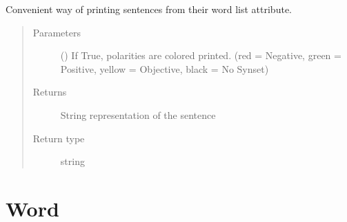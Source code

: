 \documentclass[letterpaper,10pt,english]{sphinxmanual}
\begin{document}
\begin{fulllineitems}
\begin{fulllineitems}
\begin{quote}
\begin{quote}
\begin{description}
\end{description}\end{quote}
\end{quote}

\end{fulllineitems}


\begin{fulllineitems}
\label{\detokenize{classes:loacore.classes.classes.Sentence.sentence_str}}
Convenient way of printing sentences from their word list attribute.
\begin{quote}\begin{description}
\item[{Parameters}] \leavevmode
{} () \textendash{} If True, polarities are colored printed.
(red = Negative, green = Positive, yellow = Objective, black = No Synset)

\item[{Returns}] \leavevmode
String representation of the sentence

\item[{Return type}] \leavevmode
string

\end{description}\end{quote}

\end{fulllineitems}


\end{fulllineitems}



\section{Word}
\label{\detokenize{classes:word}}
\end{document}
